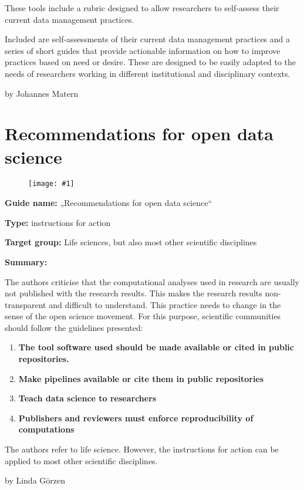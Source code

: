 \documentclass{article}
\newlength{\imgwidth}
\newcommand\scaledgraphics[2]{%
                
\settowidth{\imgwidth}{\texttt{[image: \#1]}}%
                
\setlength{\imgwidth}{\minof{\imgwidth}{#2\textwidth}}%
                
\texttt{[image: \#1]}%
                
}
\begin{document}
These tools include a rubric designed to allow researchers to self-assess their current data management practices.


Included are self-assessments of their current data management practices and a series of short guides that provide actionable information on how to improve practices based on need or desire. These are designed to be easily adapted to the needs of researchers working in different institutional and disciplinary contexts.





by Johannes Matern





\section{ Recommendations for open data science}\label{H2986141}





\begin{figure}
\scaledgraphics{10e3bc75-5c14-48e3-a161-d685105f455b.png}{1}
\label{F57414871}
\end{figure}





\textbf{Guide name:} „Recommendations for open data science“ \autocite{gymrek_recommendations_2016}


\textbf{Type:} instructions for action


\textbf{Target group:} Life sciences, but also most other scientific disciplines


\textbf{Summary: }


The authors criticise that the computational analyses used in research are usually not published with the research results. This makes the research results non-transparent and difficult to understand. This practice needs to change in the sense of the open science movement. For this purpose, scientific communities should follow the guidelines presented:

\begin{enumerate}
\item \textbf{The tool software used should be made available or cited in public repositories.}


\item \textbf{Make pipelines available or cite them in public repositories}


\item \textbf{Teach data science to researchers}


\item \textbf{Publishers and reviewers must enforce reproducibility of computations}


\end{enumerate}

The authors refer to life science. However, the instructions for action can be applied to most other scientific disciplines.





by Linda Görzen





\printbibliography[title={Bibliography}]
\end{document}
